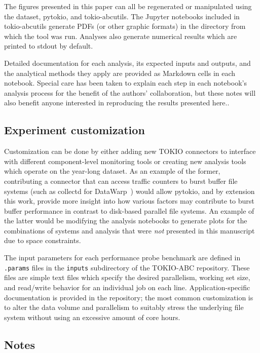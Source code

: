The figures presented in this paper can all be regenerated or manipulated using the dataset, pytokio, and tokio-abcutils.
The Jupyter notebooks included in tokio-abcutils generate PDFs (or other graphic formats) in the directory from which the tool was run.
Analyses also generate numerical results which are printed to stdout by default.

Detailed documentation for each analysis, its expected inputs and outputs, and the analytical methods they apply are provided as Markdown cells in each notebook.
Special care has been taken to explain each step in each notebook's analysis process for the benefit of the authors' collaboration, but these notes will also benefit anyone interested in reproducing the results presented here..

\subsection{Experiment customization}

Customization can be done by either adding new TOKIO connectors to interface with different component-level monitoring tools or creating new analysis tools which operate on the year-long dataset.
As an example of the former, contributing a connector that can access traffic counters to burst buffer file systems (such as collectd for DataWarp~\cite{Lockwood2018tokio}) would allow pytokio, and by extension this work, provide more insight into how various factors may contribute to burst buffer performance in contrast to disk-based parallel file systems.
An example of the latter would be modifying the analysis notebooks to generate plots for the combinations of systems and analysis that were \emph{not} presented in this manuscript due to space constraints.

The input parameters for each performance probe benchmark are defined in \texttt{.params} files in the \texttt{inputs} subdirectory of the TOKIO-ABC repository.
These files are simple text files which specify the desired parallelism, working set size, and read/write behavior for an individual job on each line.
Application-specific documentation is provided in the repository; the most common customization is to alter the data volume and parallelism to suitably stress the underlying file system without using an excessive amount of core hours.

\subsection{Notes}


